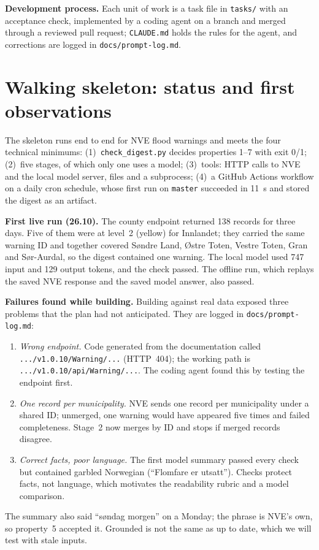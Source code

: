 \documentclass{article}
\newcommand{\code}[1]{\texttt{#1}}
\begin{document}
\textbf{Development process.} Each unit of work is a task file in \code{tasks/} with an acceptance check, implemented by a coding agent on a branch and merged through a reviewed pull request; \code{CLAUDE.md} holds the rules for the agent, and corrections are logged in \code{docs/prompt-log.md}.

\section{Walking skeleton: status and first observations}

The skeleton runs end to end for NVE flood warnings and meets the four technical minimums: (1)~\code{check\_digest.py} decides properties 1--7 with exit 0/1; (2)~five stages, of which only one uses a model; (3)~tools: HTTP calls to NVE and the local model server, files and a subprocess; (4)~a GitHub Actions workflow on a daily cron schedule, whose first run on \code{master} succeeded in 11~s and stored the digest as an artifact.

\textbf{First live run (26.10).} The county endpoint returned 138 records for three days. Five of them were at level~2 (yellow) for Innlandet; they carried the same warning ID and together covered Søndre Land, Østre Toten, Vestre Toten, Gran and Sør-Aurdal, so the digest contained one warning. The local model used 747 input and 129 output tokens, and the check passed. The offline run, which replays the saved NVE response and the saved model answer, also passed.

\textbf{Failures found while building.} Building against real data exposed three problems that the plan had not anticipated. They are logged in \code{docs/prompt-log.md}:
\begin{enumerate}
  \item \emph{Wrong endpoint.} Code generated from the documentation called \code{.../v1.0.10/Warning/...} (HTTP~404); the working path is \code{.../v1.0.10/api/Warning/...}. The coding agent found this by testing the endpoint first.
  \item \emph{One record per municipality.} NVE sends one record per municipality under a shared ID; unmerged, one warning would have appeared five times and failed completeness. Stage~2 now merges by ID and stops if merged records disagree.
  \item \emph{Correct facts, poor language.} The first model summary passed every check but contained garbled Norwegian (``Flomfare er utsatt''). Checks protect facts, not language, which motivates the readability rubric and a model comparison.
\end{enumerate}
The summary also said ``søndag morgen'' on a Monday; the phrase is NVE's own, so property~5 accepted it. Grounded is not the same as up to date, which we will test with stale inputs.
\end{document}
